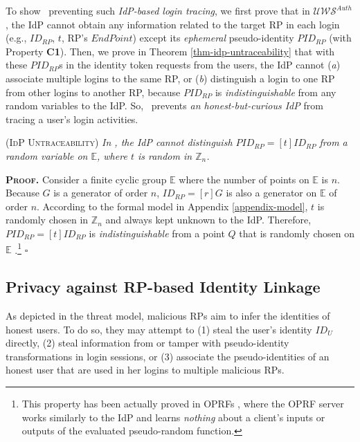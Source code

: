 To show \usso\ preventing such \emph{IdP-based login tracing}, we first prove that in $\mathcal{UWS}^{Auth}$, the IdP cannot obtain any information related to the target RP in each login (e.g., $ID_{RP}$, $t$, RP's $EndPoint$) except its \emph{ephemeral} pseudo-identity $PID_{RP}$ (with Property {\bf C1}). Then, we prove in Theorem \ref{thm-idp-untraceability} that with these $PID_{RP}$s in the identity token requests from the users, the IdP cannot (\emph{a}) associate multiple logins to the same RP, or (\emph{b}) distinguish a login to one RP from other logins to another RP, because $PID_{RP}$ is \emph{indistinguishable} from any random variables to the IdP. So, \usso\ prevents \emph{an honest-but-curious IdP} from tracing a user's login activities.

\begin{thm}
\textsc{(IdP Untraceability)} \emph{In \usso, the IdP cannot distinguish $PID_{RP} = [t]ID_{RP}$ from a random variable on $\mathbb{E}$, where $t$ is random in $\mathbb{Z}_n$.}
\label{thm-idp-untraceability}
\end{thm}

\noindent\textbf{\textsc{Proof.}}
Consider a finite cyclic group $\mathbb{E}$ where the number of points on $\mathbb{E}$ is $n$.
Because $G$ is a generator of order $n$, $ID_{RP} = [r]G$ is also a generator on $\mathbb{E}$ of order $n$. According to the formal model in Appendix \ref{appendix-model}, $t$ is randomly chosen in $\mathbb{Z}_n$ and always kept unknown to the IdP. Therefore, $PID_{RP} = [t]ID_{RP}$ is \emph{indistinguishable} from a point $Q$ that is randomly chosen on $\mathbb{E}$ \cite{oprf-proved,voprf-proved}.\footnote{\newc This property has been actually proved in OPRFs \cite{oprf-proved,voprf-proved}, where the OPRF server works similarly to the IdP and learns \emph{nothing} about a client's inputs or outputs of the evaluated pseudo-random function.} \hfill $\square$

\subsection{Privacy against RP-based Identity Linkage}
\label{subsec:RP-privacy}

As depicted in the threat model, malicious RPs aim to infer the identities of honest users. To do so, they may attempt to (1) steal the user's identity $ID_U$ directly, (2) steal information from or tamper with pseudo-identity transformations in login sessions, or (3) associate the pseudo-identities of an honest user that are used in her logins to multiple malicious RPs. 

